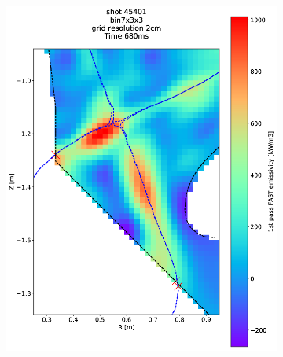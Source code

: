 \begin{figure}
\begin{subfigure}{0.2\textwidth}
         \includegraphics[trim={70 0 25 0},clip,width=\textwidth]{Chapters/chapter2/figs/45401_22.png}
         \label{fig:45401_22}
     \end{subfigure}
     \hfill
     \begin{subfigure}{0.21\textwidth}
         \centering

\end{subfigure}
\end{figure}
